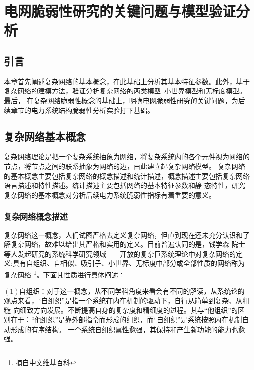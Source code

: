 \chapter{电网脆弱性研究的关键问题与模型验证分析}
\label{cha:model}

\section{引言}
\label{sec:index2}

本章首先阐述复杂网络的基本概念，在此基础上分析其基本特征参数。此外，基于复杂网络的建模方法，验证分析复杂网络的两类模型--小世界模型和无标度模型。最后，
在复杂网络脆弱性概念的基础上，明确电网脆弱性研究的关键问题，为后续章节的电力系统结构脆弱性分析实验打下基础。

\section{复杂网络基本概念}
\label{sec:powersys}
复杂网络理论是把一个复杂系统抽象为网络，将复杂系统内的各个元件视为网络的节点，将节点之间的联系抽象为网络的边，由此建立起复杂网络模型。
复杂网络的基本概念主要包括复杂网络的概念描述和统计描述，概念描述主要包括复杂网络语言描述和特性描述。统计描述主要包括网络的基本特征参数和静
态特性，研究复杂网络的基本概念对分析后续电力系统脆弱性指标有着重要的意义。

\subsection{复杂网络概念描述}
\label{sec:composite}
复杂网络这一概念，人们试图严格去定义复杂网络，但直到现在还未充分认识和了解复杂网络，故难以给出其严格和实用的定义\cite{refs31}。目前普遍认同的是，钱学森
院士等人发起研究的系统科学研究领域——开放的复杂巨系统理论中对复杂网络的定义:具有自组织、自相似、吸引子、小世界、无标度中部分或全部性质的网络称为复杂网络
\footnote{摘自中文维基百科}。下面其性质进行具体阐述：

$(1)$自组织：对于这一概念，从不同学科角度来看会有不同的解读，从系统论的观点来看，“自组织”是指一个系统在内在机制的驱动下，自行从简单到复杂、从粗糙
向细致方向发展。不断提高自身的复杂度和精细度的过程。其与“他组织”的区别在于：“他组织”是靠外部指令而形成的组织，而“自组织”是系统按照内在机制自动形成的有序结构。
一个系统自组织属性愈强，其保持和产生新功能的能力也愈强。

